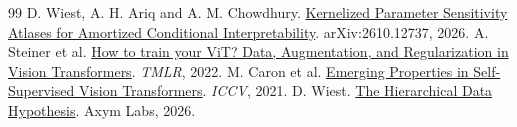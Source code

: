 \documentclass[11pt]{article}
\begin{document}
\begin{thebibliography}{99}
 D. Wiest, A. H. Ariq and A. M. Chowdhury. \href{https://arxiv.org/abs/2610.12737}{Kernelized Parameter Sensitivity Atlases for Amortized Conditional Interpretability}. arXiv:2610.12737, 2026.
 A. Steiner et al. \href{https://arxiv.org/abs/2106.10270}{How to train your ViT? Data, Augmentation, and Regularization in Vision Transformers}. \textit{TMLR}, 2022.
 M. Caron et al. \href{https://arxiv.org/abs/2104.14294}{Emerging Properties in Self-Supervised Vision Transformers}. \textit{ICCV}, 2021.
 D. Wiest. \href{https://axym.org/work/hierarchical-data-hypothesis/}{The Hierarchical Data Hypothesis}. Axym Labs, 2026.
\end{thebibliography}
\end{document}
